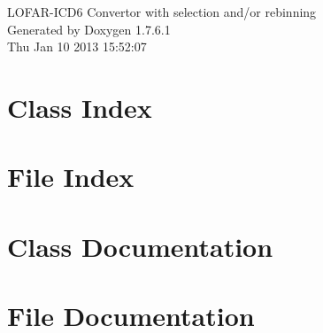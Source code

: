 \documentclass[a4paper]{book}
\begin{document}
\begin{titlepage}
\vspace*{7cm}
\begin{center}
{\Large \-L\-O\-F\-A\-R-\/\-I\-C\-D6 \-Convertor with selection and/or rebinning }\\
\vspace*{1cm}
{\large \-Generated by Doxygen 1.7.6.1}\\
\vspace*{0.5cm}
{\small Thu Jan 10 2013 15:52:07}\\
\end{center}
\end{titlepage}
\clearemptydoublepage
{}
\tableofcontents
\clearemptydoublepage
{}
\chapter{\-Class \-Index}

\chapter{\-File \-Index}

\chapter{\-Class \-Documentation}





\chapter{\-File \-Documentation}






\printindex
\end{document}
